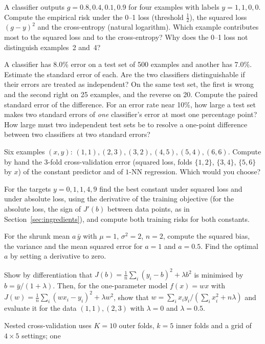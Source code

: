 \documentclass[11pt]{article}
\begin{document}
\begin{questions}
\begin{calculations}
\item A classifier outputs $g = 0.8, 0.4, 0.1, 0.9$ for four examples with labels $y = 1, 1, 0, 0$. Compute the
empirical risk under the 0--1 loss (threshold $\frac12$), the squared loss $(g - y)^2$ and the cross-entropy (natural
logarithm). Which example contributes most to the squared loss and to the cross-entropy? Why does the 0--1 loss not
distinguish examples~2 and~4?
\item A classifier has 8.0\% error on a test set of 500 examples and another has 7.0\%. Estimate the standard error of
each. Are the two classifiers distinguishable if their errors are treated as independent? On the same test set, the
first is wrong and the second right on 25 examples, and the reverse on 20. Compute the paired standard error of the
difference. For an error rate near 10\%, how large a test set makes two standard errors of \emph{one} classifier's
error at most one percentage point? How large must two independent test sets be to resolve a one-point difference
between two classifiers at two standard errors?
\item Six examples $(x, y)$: $(1, 1), (2, 3), (3, 2), (4, 5), (5, 4), (6, 6)$. Compute by hand the 3-fold
cross-validation error (squared loss, folds $\{1, 2\}$, $\{3, 4\}$, $\{5, 6\}$ by $x$) of the constant predictor and of
$1$-NN regression. Which would you choose?
\item For the targets $y = 0, 1, 1, 4, 9$ find the best constant under squared loss and under absolute loss, using the
derivative of the training objective (for the absolute loss, the sign of $J'(b)$ between data points, as in
Section~\ref{sec:ingredients}), and compute both training risks for both constants.
\item For the shrunk mean $a\,\bar y$ with $\mu = 1$, $\sigma^2 = 2$, $n = 2$, compute the squared bias, the variance
and the mean squared error for $a = 1$ and $a = 0.5$. Find the optimal $a$ by setting a derivative to zero.
\item Show by differentiation that $J(b) = \frac1n \sum_i (y_i - b)^2 + \lambda b^2$ is minimised by
$b = \bar y/(1 + \lambda)$. Then, for the one-parameter model $f(x) = wx$ with
$J(w) = \frac1n \sum_i (w x_i - y_i)^2 + \lambda w^2$, show that $w = \sum_i x_i y_i / (\sum_i x_i^2 + n\lambda)$ and
evaluate it for the data $(1, 1), (2, 3)$ with $\lambda = 0$ and $\lambda = 0.5$.
\item Nested cross-validation uses $K = 10$ outer folds, $k = 5$ inner folds and a grid of $4 \times 5$ settings; one

\end{calculations}
\end{questions}
\end{document}
